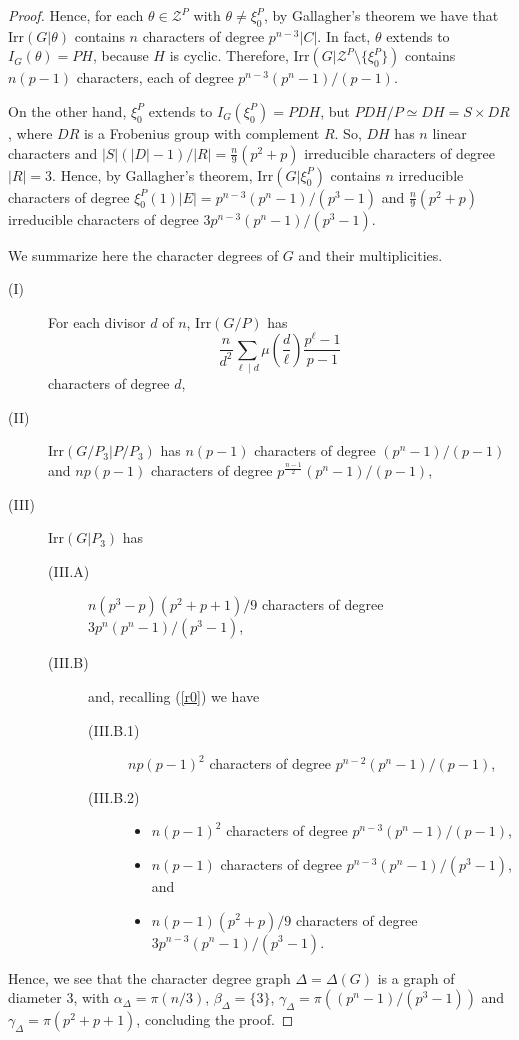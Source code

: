 \documentclass{amsart}
\def\irr#1{\mathrm{Irr}(#1)}
\begin{document}
\begin{proof}
 Hence, for each $\theta \in \mathcal{Z}^P$ with $\theta \neq \xi_0^P$,  by Gallagher's theorem we have that $\irr{G|\theta}$ contains
 $n$ characters of degree $p^{n-3}|C|$. In fact, $\theta$ extends to $I_G(\theta)=PH$, because  $H$ is cyclic.
Therefore,  $\irr{G|\mathcal{Z}^P \setminus\{\xi_0^P\}}$ contains $n(p-1)$ characters, each of  degree $p^{n-3}(p^n -1)/(p-1)$.

 On the other hand,  $\xi_0^P$ extends to  $I_G(\xi_0^P) = PDH$, but  $PDH/P \simeq DH = S \times DR$, where $DR$ is a Frobenius group with complement $R$.
 So, $DH$ has $n$ linear characters and $ |S| (|D|-1)/|R| = \frac{n}{9}(p^2+p)$ irreducible characters of degree $|R| = 3$.
Hence, by Gallagher's theorem, $\irr{G|\xi_0^P}$ contains $n$ irreducible characters
 of degree $\xi_0^P(1)|E| = p^{n-3}(p^n-1)/(p^3 -1)$ and $\frac{n}{9}(p^2+p)$ irreducible characters of degree $3p^{n-3}(p^n-1)/(p^3 -1)$.

\medskip We summarize here the character degrees of $G$ and their multiplicities.
\begin{description}
\item[(I)] For each divisor $d$ of $n$, $\mathrm{Irr}(G/P)$ has $$\frac{n}{d^2}\sum_{\ell\mid d}\mu\left(\frac{d}{\ell}\right)\frac{p^\ell-1}{p-1}$$ characters of degree $d$,
\item[(II)] $\mathrm{Irr}(G/P_3| P/P_3)$ has $n(p-1)$ characters of degree $(p^n-1)/(p-1)$ and $np(p-1)$ characters of degree $p^{\frac{n-1}{2}}(p^n-1)/(p-1)$,
\item[(III)] $\mathrm{Irr}(G| P_3)$ has
  \begin{description}
\item[(III.A)] $n(p^3-p)(p^2+p+1)/9$ characters of degree $3 p^n (p^n-1)/(p^3-1)$,

  \item[(III.B)] and, recalling  (\ref{r0}) we have
 \begin{description}
\item[(III.B.1)]$np(p-1)^2$ characters of degree $p^{n-2} (p^n-1)/(p-1)$,
\item[(III.B.2)]
\begin{itemize}
\item $n(p-1)^2$ characters of degree $p^{n-3}(p^n-1)/(p-1)$,
\item  $n(p-1)$ characters of degree $p^{n-3} (p^n-1)/(p^3-1)$, and
\item $n(p-1)(p^2+p)/9$ characters of degree $3 p^{n-3}(p^n-1)/(p^3-1)$.
\end{itemize}
  \end{description}
\end{description}
\end{description}


Hence,
we see that  the character degree graph $\Delta = \Delta(G)$ is a graph of diameter $3$, with
$\alpha_{\Delta}  = \pi(n/3)$, $\beta_{\Delta} = \{ 3\}$, $\gamma_{\Delta} = \pi((p^n-1)/(p^3-1))$ and
$\gamma_{\Delta} = \pi(p^2+p+1)$, concluding the proof.
\end{proof}
\end{document}

